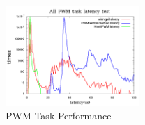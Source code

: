 \documentclass[conference]{IEEEtran}
\begin{document}
\FloatBarrier

\begin{figure}
	\centering
	\includegraphics[width=2in]{img/ksoftpwm_load.png}
	\caption{PWM Task Performance}
	\label{fig:ksoftpwm_perf}
\end{figure}



\end{document}
